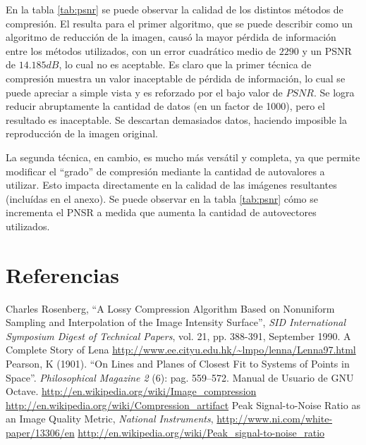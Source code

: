 \documentclass[twocolumn,a4paper,10pt]{article}
\begin{document}
En la tabla \ref{tab:psnr} se puede observar la calidad de los distintos m\'etodos de compresi\'on.
El resulta para el primer algoritmo, que se puede describir como un algoritmo de reducción de la imagen, causó la mayor pérdida de información entre los 
métodos utilizados, con un error cuadrático medio de $2290$ y un PSNR de $14.185 dB$, lo cual no es aceptable.
Es claro que la primer t\'ecnica de compresi\'on muestra un valor inaceptable de pérdida de información, lo cual se puede apreciar a simple vista y es 
reforzado por el bajo valor de $PSNR$. Se logra reducir abruptamente la cantidad de datos (en un factor de 1000), pero el resultado es inaceptable. 
Se descartan demasiados datos, haciendo imposible la reproducci\'on de la imagen original.

La segunda t\'ecnica, en cambio, es mucho m\'as vers\'atil y completa, ya que permite modificar el ``grado'' de compresi\'on mediante la cantidad de autovalores 
a utilizar.  Esto impacta directamente en la calidad de las imágenes resultantes (incluídas en el anexo). Se puede observar en la tabla \ref{tab:psnr} cómo 
se incrementa el PNSR a medida que aumenta la cantidad de autovectores utilizados.

\section*{Referencias}
\begin{thebibliography}{99}
    
    Charles Rosenberg, ``A Lossy Compression Algorithm Based on Nonuniform Sampling and Interpolation of the Image Intensity Surface'', \textit{SID International Symposium Digest of Technical Papers}, vol. 21, pp. 388-391, September 1990.
    A Complete Story of Lena \url{http://www.ee.cityu.edu.hk/~lmpo/lenna/Lenna97.html}
     Pearson, K (1901). ``On Lines and Planes of Closest Fit to Systems of Points in Space''. \textit{Philosophical Magazine 2} (6): pag. 559–572.
     Manual de Usuario de GNU Octave.
     \url{http://en.wikipedia.org/wiki/Image\_compression}
     \url{http://en.wikipedia.org/wiki/Compression\_artifact}
     Peak Signal-to-Noise Ratio as an Image Quality Metric, \textit{National Instruments}, \url{http://www.ni.com/white-paper/13306/en}
     \url{http://en.wikipedia.org/wiki/Peak_signal-to-noise_ratio}

\end{thebibliography}
\end{document}
